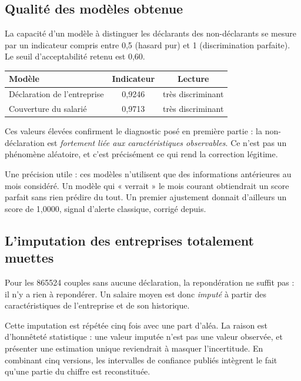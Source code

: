 \documentclass[11pt,a4paper]{article}
\begin{document}
\subsection{Qualité des modèles obtenue}

La capacité d'un modèle à distinguer les déclarants des non-déclarants se
mesure par un indicateur compris entre 0,5 (hasard pur) et 1
(discrimination parfaite). Le seuil d'acceptabilité retenu est 0,60.

\begin{center}
\begin{tabular}{lcc}
\toprule
\textbf{Modèle} & \textbf{Indicateur} & \textbf{Lecture} \\
\midrule
Déclaration de l'entreprise & 0,9246 & très discriminant \\
Couverture du salarié & 0,9713 & très discriminant \\
\bottomrule
\end{tabular}
\end{center}

Ces valeurs élevées confirment le diagnostic posé en première partie : la
non-déclaration est \emph{fortement liée aux caractéristiques
observables}. Ce n'est pas un phénomène aléatoire, et c'est précisément ce
qui rend la correction légitime.

Une précision utile : ces modèles n'utilisent que des informations
antérieures au mois considéré. Un modèle qui « verrait » le mois courant
obtiendrait un score parfait sans rien prédire du tout. Un premier
ajustement donnait d'ailleurs un score de 1,0000, signal d'alerte
classique, corrigé depuis.

\subsection{L'imputation des entreprises totalement muettes}

Pour les \num{865524} couples sans aucune déclaration, la repondération ne
suffit pas : il n'y a rien à repondérer. Un salaire moyen est donc
\emph{imputé} à partir des caractéristiques de l'entreprise et de son
historique.

Cette imputation est répétée cinq fois avec une part d'aléa. La raison est
d'honnêteté statistique : une valeur imputée n'est pas une valeur
observée, et présenter une estimation unique reviendrait à masquer
l'incertitude. En combinant cinq versions, les intervalles de confiance
publiés intègrent le fait qu'une partie du chiffre est reconstituée.
\end{document}
